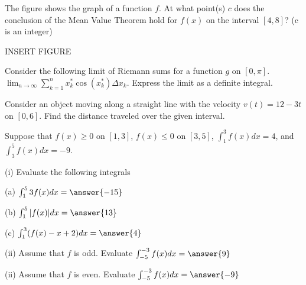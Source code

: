\documentclass{ximera}
\begin{document}
\begin{exercise}
The figure shows the graph of a function $f$. At what point(s) $c$ does the conclusion of the Mean Value Theorem hold for $f(x)$ on the interval $[4,8]$? (c is an integer)

INSERT FIGURE

\begin{selectAll}
\end{selectAll}
\end{exercise}

\begin{exercise}
Consider the following limit of Riemann sums for a function $g$ on $[0, \pi]$. $\lim_{n\to\infty}\sum_{k=1}^n x_k^* \cos(x_k^*)\Delta x_k$.  Express the limit as a definite integral.

\begin{multipleChoice}
\end{multipleChoice}
\end{exercise}

\begin{exercise}
Consider an object moving along a straight line with the velocity $v(t)=12-3t$ on $[0,6]$.  Find the distance traveled over the given interval.
\begin{multipleChoice}
\end{multipleChoice}
\end{exercise}

\begin{exercise}
Suppose that $f(x)\geq 0$ on $[1,3]$, $f(x)\leq 0$ on $[3,5]$, $\int_1^3f(x)dx=4$, and $\int_3^5f(x)dx=-9$.

(i) Evaluate the following integrals

(a) $\int_1^5 3f(x)dx=\answer{-15}$

(b) $\int_1^5 |f(x)|dx=\answer{13}$

(c) $\int_1^3 (f(x)-x+2)dx=\answer{4}$

(ii) Assume that $f$ is odd. Evaluate $\int_{-5}^{-3}f(x)dx=\answer{9}$

(ii) Assume that $f$ is even. Evaluate $\int_{-5}^{-3}f(x)dx=\answer{-9}$

\end{exercise}
\end{document}
